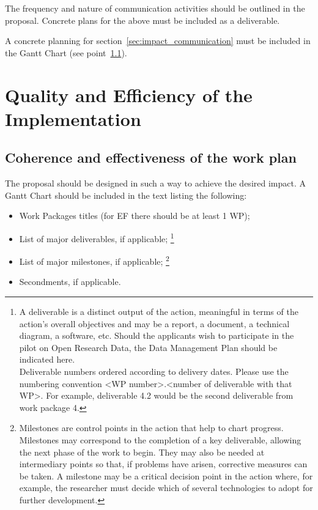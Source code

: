 \medskip\noindent
The frequency and nature of communication activities should be
outlined in the proposal. Concrete plans for the above must be
included as a deliverable.

\medskip\noindent
A concrete planning for section~\ref{sec:impact_communication}
must be included in the Gantt Chart (see
point~\ref{sec:implementation_work_plan}).

\newpage

\section{Quality and Efficiency of the Implementation}
  \label{sec:implementation}

\subsection{Coherence and effectiveness of the work plan}
\label{sec:implementation_work_plan}

The proposal should be designed in such a way to achieve the
desired impact.  A Gantt Chart should be included in the text
listing the following:
\begin{itemize}
  \item Work Packages titles (for EF there should be at least 1 WP); 
  \item List of major deliverables, if applicable;%
  \footnote{A deliverable is a distinct output of the action,
  meaningful in terms of the action's overall objectives and may
  be a report, a document, a technical diagram, a software, etc.
  Should the applicants wish to participate in the pilot on Open
  Research Data, the Data Management Plan should be indicated
  here.\\
  Deliverable numbers ordered according to delivery dates. 
  Please use the numbering convention <WP number>.<number of
  deliverable with that WP>. For example, deliverable 4.2 would
  be the second deliverable from work package 4.}
  \item List of major milestones, if applicable;%
  \footnote{Milestones are control points in the action that help
  to chart progress. Milestones may correspond to the completion
  of a key deliverable, allowing the next phase of the work to
  begin.  They may also be needed at intermediary points so that,
  if problems have arisen, corrective measures can be taken. 
  A milestone may be a critical decision point in the action
  where, for example, the researcher must decide which of several
  technologies to adopt for further development.}
  \item Secondments, if applicable.
\end{itemize}

